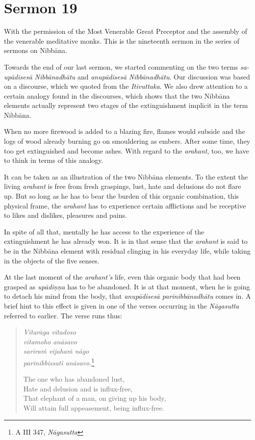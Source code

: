 \chapter{Sermon 19}

\NibbanaOpeningQuote

With the permission of the Most Venerable Great Preceptor and the assembly of the venerable meditative monks. This is the nineteenth sermon in the series of sermons on Nibbāna.

Towards the end of our last sermon, we started commenting on the two terms \emph{sa-upādisesā Nibbānadhātu} and \emph{anupādisesā Nibbānadhātu}. Our discussion was based on a discourse, which we quoted from the \emph{Itivuttaka}. We also drew attention to a certain analogy found in the discourses, which shows that the two Nibbāna elements actually represent two stages of the extinguishment implicit in the term Nibbāna.

When no more firewood is added to a blazing fire, flames would subside and the logs of wood already burning go on smouldering as embers. After some time, they too get extinguished and become ashes. With regard to the \emph{arahant}, too, we have to think in terms of this analogy.

It can be taken as an illustration of the two Nibbāna elements. To the extent the living \emph{arahant} is free from fresh graspings, lust, hate and delusions do not flare up. But so long as he has to bear the burden of this organic combination, this physical frame, the \emph{arahant} has to experience certain afflictions and be receptive to likes and dislikes, pleasures and pains.

In spite of all that, mentally he has access to the experience of the extinguishment he has already won. It is in that sense that the \emph{arahant} is said to be in the Nibbāna element with residual clinging in his everyday life, while taking in the objects of the five senses.

At the last moment of the \emph{arahant's} life, even this organic body that had been grasped as \emph{upādiṇṇa} has to be abandoned. It is at that moment, when he is going to detach his mind from the body, that \emph{anupādisesā parinibbānadhātu} comes in. A brief hint to this effect is given in one of the verses occurring in the \emph{Nāgasutta} referred to earlier. The verse runs thus:

\begin{quote}
\emph{Vītarāga vītadoso}\\
\emph{vītamoho anāsavo}\\
\emph{sarīraṁ vijahaṁ nāgo}\\
\emph{parinibbissati anāsavo.}\footnote{A III 347, \emph{Nāgasutta}}

The one who has abandoned lust,\\
Hate and delusion and is influx-free,\\
That elephant of a man, on giving up his body,\\
Will attain full appeasement, being influx-free.
\end{quote}

